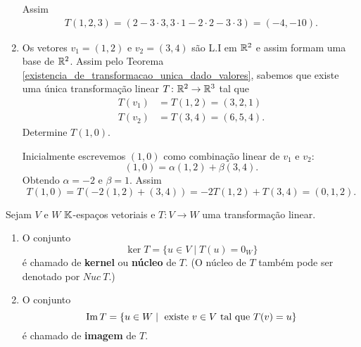 \begin{exemplos}
\begin{enumerate}[label={\arabic*})]
\begin{solucao}
            Assim
            \begin{align*}
                T(1, 2, 3) = (2 - 3\cdot3, 3\cdot 1 - 2 \cdot 2 - 3 \cdot 3) = (-4, -10).
            \end{align*}
        \end{solucao}
        \item Os vetores $v_1 = (1,2)$ e $v_2 = (3,4)$ s\~ao L.I em $\mathbb{R}^2$ e assim formam uma base de $\mathbb{R}^2$. Assim pelo Teorema \ref{existencia_de_transformacao_unica_dado_valores}, sabemos que existe uma \'unica transforma\c{c}\~ao linear $T \colon \mathbb{R}^2 \to \mathbb{R}^3$ tal que
        \begin{align*}
            T(v_1) &= T(1,2) = (3,2,1)\\
            T(v_2) &= T(3,4) = (6,5,4).
        \end{align*}
        Determine $T(1,0)$.
        \begin{solucao}
            Inicialmente escrevemos $(1,0)$ como combina\c{c}\~ao linear de $v_1$ e $v_2$:
            \[
            (1, 0) = \alpha(1,2) + \beta(3,4).
            \]
            Obtendo $\alpha = -2$ e $\beta = 1$. Assim
            \[
            T(1,0) = T(-2(1,2) + (3,4)) = -2T(1,2) + T(3,4) = (0,1,2).
            \]
        \end{solucao}
    \end{enumerate}
\end{exemplos}

\begin{definicao}
  Sejam $V$ e $W$ $\mathbb{K}$-espa\c{c}os vetoriais e $T \colon V \to W$ uma transforma\c{c}\~ao linear.
  \begin{enumerate}[label={\roman*})]
    \item O conjunto
    \[
      \ker T = \{u \in V \mid T(u) = 0_W\}
    \]
    \'e chamado de \textbf{kernel} ou \textbf{n\'ucleo} de $T$. (O n\'ucleo de $T$ tamb\'em pode ser denotado por $Nuc\ T$.)

    \item O conjunto
    \[
      {\rm Im\,} T = \{u \in W \mid \mbox{ existe } v \in V \mbox{ tal que } T(v) = u\}
    \]
    \'e chamado de \textbf{imagem} de $T$.
  \end{enumerate}
\end{definicao}

